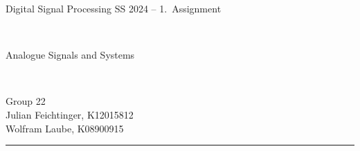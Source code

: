 \documentclass[12pt,a4paper,austrian]{article}
\begin{document}
\pagestyle{plain}


\thispagestyle{empty}
\noindent
\begin{minipage}[b][4cm]{1.0\textwidth}  
\begin{center}
\begin{bf} 
\begin{large} Digital Signal Processing SS 2024 -- 1.~Assignment\end{large} \\
\vspace{0.3cm}
\begin{Large} Analogue Signals and Systems  \end{Large} \\
\vspace{0.3cm}
\end{bf}
\begin{large}
Group 22\\
Julian Feichtinger, K12015812\\
Wolfram Laube, K08900915\\
\end{large} 
\end{center}
\end{minipage}

\noindent \rule[0.8em]{\textwidth}{0.12mm}\\[-0.5em]
\end{document}
